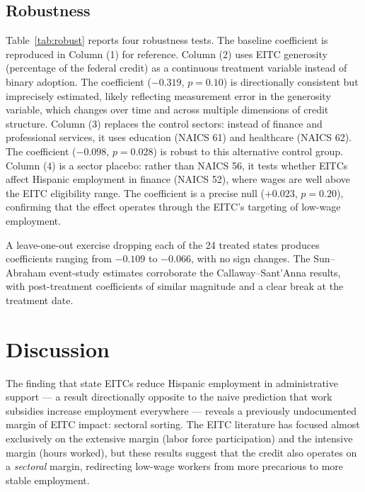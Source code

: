 \documentclass[12pt]{article}
\begin{document}
\subsection{Robustness}

Table~\ref{tab:robust} reports four robustness tests. The baseline coefficient is reproduced in Column (1) for reference. Column (2) uses EITC generosity (percentage of the federal credit) as a continuous treatment variable instead of binary adoption. The coefficient ($-0.319$, $p = 0.10$) is directionally consistent but imprecisely estimated, likely reflecting measurement error in the generosity variable, which changes over time and across multiple dimensions of credit structure. Column (3) replaces the control sectors: instead of finance and professional services, it uses education (NAICS 61) and healthcare (NAICS 62). The coefficient ($-0.098$, $p = 0.028$) is robust to this alternative control group. Column (4) is a sector placebo: rather than NAICS 56, it tests whether EITCs affect Hispanic employment in finance (NAICS 52), where wages are well above the EITC eligibility range. The coefficient is a precise null ($+0.023$, $p = 0.20$), confirming that the effect operates through the EITC's targeting of low-wage employment.



A leave-one-out exercise dropping each of the 24 treated states produces coefficients ranging from $-0.109$ to $-0.066$, with no sign changes. The Sun--Abraham event-study estimates corroborate the Callaway--Sant'Anna results, with post-treatment coefficients of similar magnitude and a clear break at the treatment date.

\section{Discussion}

The finding that state EITCs reduce Hispanic employment in administrative support --- a result directionally opposite to the naive prediction that work subsidies increase employment everywhere --- reveals a previously undocumented margin of EITC impact: sectoral sorting. The EITC literature has focused almost exclusively on the extensive margin (labor force participation) and the intensive margin (hours worked), but these results suggest that the credit also operates on a \textit{sectoral} margin, redirecting low-wage workers from more precarious to more stable employment.
\end{document}
